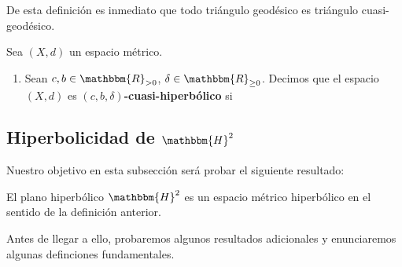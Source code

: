 \documentclass[12pt]{report}
\theoremstyle{largebreak}
\newcommand{\bbm}[1]{\ensuremath{\mathbbm{#1}}}
\begin{document}
    \begin{obs}
        De esta definición es inmediato que todo triángulo geodésico es triángulo cuasi-geodésico.
    \end{obs}

    \begin{mydef}
        Sea $(X,d)$ un espacio métrico.
        \begin{enumerate}[label = \textit{(\arabic*)}]
            \item Sean $c,b\in\bbm{R}_{>0}$, $\delta\in\bbm{R}_{\geq0}$. Decimos que el espacio $(X,d)$ es \textbf{$(c,b,\delta)$-cuasi-hiperbólico} si 
        \end{enumerate}
    \end{mydef}

    \subsection{Hiperbolicidad de $\bbm{H}^2$}

    Nuestro objetivo en esta subsección será probar el siguiente resultado:

    \begin{propo}
        El plano hiperbólico $\bbm{H}^2$ es un espacio métrico hiperbólico en el sentido de la definición anterior.
    \end{propo}

    Antes de llegar a ello, probaremos algunos resultados adicionales y enunciaremos algunas definciones fundamentales.
\end{document}
